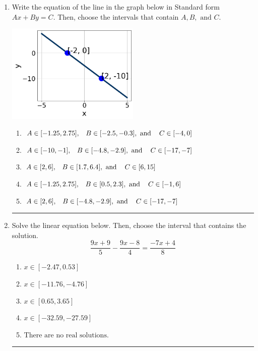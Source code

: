 \documentclass[14pt]{extbook}
\newcommand{\litem}[1]{\item#1\hspace*{-1cm}\rule{\textwidth}{0.4pt}}
\begin{document}
\begin{enumerate}
{\begin{enumerate}[label=\Alph*.]
\end{enumerate} }
\litem{
Write the equation of the line in the graph below in Standard form $Ax+By=C$. Then, choose the intervals that contain $A, B, \text{ and } C$.
\begin{center}
    \includegraphics[width=0.5\textwidth]{../Figures/linearGraphToStandardC.png}
\end{center}
\begin{enumerate}[label=\Alph*.]
\item \( A \in [-1.25, 2.75], \hspace{3mm} B \in [-2.5, -0.3], \text{ and } \hspace{3mm} C \in [-4, 0] \)
\item \( A \in [-10, -1], \hspace{3mm} B \in [-4.8, -2.9], \text{ and } \hspace{3mm} C \in [-17, -7] \)
\item \( A \in [2, 6], \hspace{3mm} B \in [1.7, 6.4], \text{ and } \hspace{3mm} C \in [6, 15] \)
\item \( A \in [-1.25, 2.75], \hspace{3mm} B \in [0.5, 2.3], \text{ and } \hspace{3mm} C \in [-1, 6] \)
\item \( A \in [2, 6], \hspace{3mm} B \in [-4.8, -2.9], \text{ and } \hspace{3mm} C \in [-17, -7] \)

\end{enumerate} }
\litem{
Solve the linear equation below. Then, choose the interval that contains the solution.\[ \frac{9x + 9}{5} - \frac{9x -8}{4} = \frac{-7x + 4}{8} \]\begin{enumerate}[label=\Alph*.]
\item \( x \in [-2.47, 0.53] \)
\item \( x \in [-11.76, -4.76] \)
\item \( x \in [0.65, 3.65] \)
\item \( x \in [-32.59, -27.59] \)
\item \( \text{There are no real solutions.} \)


\end{enumerate}}
\end{enumerate}
\end{document}
